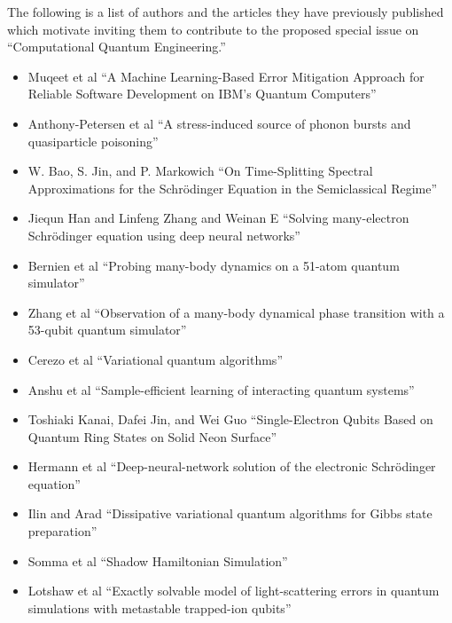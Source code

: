 \documentclass[]{article}
\begin{document}

The following is a list of authors and the articles they
have previously published which motivate inviting them to 
contribute to the proposed special issue on ``Computational
Quantum Engineering.''

\begin{itemize}
\item Muqeet et al\cite{muqeet2024machine}
``A Machine Learning-Based Error Mitigation Approach for Reliable Software Development on IBM’s Quantum Computers''
\item Anthony-Petersen et al\cite{anthony2024stress}
``A stress-induced source of phonon bursts and quasiparticle poisoning''
\item W. Bao, S. Jin, and P. Markowich\cite{BAO2002487}
``On Time-Splitting Spectral Approximations for the Schrödinger Equation in the Semiclassical Regime''
\item
Jiequn Han and Linfeng Zhang and Weinan E\cite{HAN2019108929}
``Solving many-electron Schrödinger equation using deep neural networks''
\item
Bernien et al\cite{bernien2017probing}
``Probing many-body dynamics on a 51-atom quantum simulator''
\item
Zhang et al\cite{zhang2017observation}
``Observation of a many-body dynamical phase transition with a 53-qubit quantum simulator''
\item 
Cerezo et al\cite{cerezo2021variational}
``Variational quantum algorithms''
\item
Anshu et al\cite{anshu2021sample}
``Sample-efficient learning of interacting quantum systems''
\item
Toshiaki Kanai, Dafei Jin, and Wei Guo\cite{PhysRevLett.132.250603}
``Single-Electron Qubits Based on Quantum Ring States on Solid Neon Surface''
\item
Hermann et al\cite{hermann2020deep}
``Deep-neural-network solution of the electronic Schr{\"o}dinger equation''
\item
Ilin and Arad\cite{ilin2024dissipativevariationalquantumalgorithms}
``Dissipative variational quantum algorithms for Gibbs state preparation''
\item
Somma et al\cite{somma2024shadowhamiltoniansimulation}
``Shadow Hamiltonian Simulation''
\item 
Lotshaw et al\cite{PhysRevA.110.L030803}
``Exactly solvable model of light-scattering errors in quantum simulations with metastable trapped-ion qubits''

\end{itemize}
\end{document}
